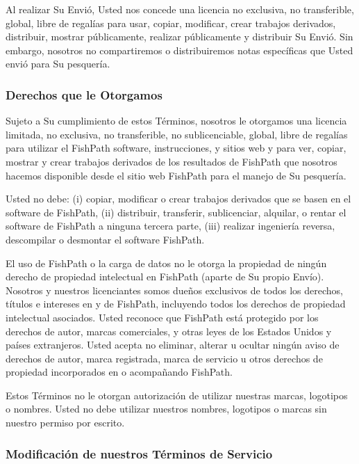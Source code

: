\documentclass[
  11pt,
]{book}
\begin{document}
Al realizar Su Envió, Usted nos concede una licencia no exclusiva, no transferible, global, libre de regalías para usar, copiar, modificar, crear trabajos derivados, distribuir, mostrar públicamente, realizar públicamente y distribuir Su Envió. Sin embargo, nosotros no compartiremos o distribuiremos notas específicas que Usted envió para Su pesquería.

\hypertarget{derechos-que-le-otorgamos}{%
\subsubsection*{Derechos que le Otorgamos}\label{derechos-que-le-otorgamos}}

Sujeto a Su cumplimiento de estos Términos, nosotros le otorgamos una licencia limitada, no exclusiva, no transferible, no sublicenciable, global, libre de regalías para utilizar el FishPath software, instrucciones, y sitios web y para ver, copiar, mostrar y crear trabajos derivados de los resultados de FishPath que nosotros hacemos disponible desde el sitio web FishPath para el manejo de Su pesquería.

Usted no debe: (i) copiar, modificar o crear trabajos derivados que se basen en el software de FishPath, (ii) distribuir, transferir, sublicenciar, alquilar, o rentar el software de FishPath a ninguna tercera parte, (iii) realizar ingeniería reversa, descompilar o desmontar el software FishPath.

El uso de FishPath o la carga de datos no le otorga la propiedad de ningún derecho de propiedad intelectual en FishPath (aparte de Su propio Envío). Nosotros y nuestros licenciantes somos dueños exclusivos de todos los derechos, títulos e intereses en y de FishPath, incluyendo todos los derechos de propiedad intelectual asociados. Usted reconoce que FishPath está protegido por los derechos de autor, marcas comerciales, y otras leyes de los Estados Unidos y países extranjeros. Usted acepta no eliminar, alterar u ocultar ningún aviso de derechos de autor, marca registrada, marca de servicio u otros derechos de propiedad incorporados en o acompañando FishPath.

Estos Términos no le otorgan autorización de utilizar nuestras marcas, logotipos o nombres. Usted no debe utilizar nuestros nombres, logotipos o marcas sin nuestro permiso por escrito.

\hypertarget{modificaciuxf3n-de-nuestros-tuxe9rminos-de-servicio}{%
\subsubsection*{Modificación de nuestros Términos de Servicio}\label{modificaciuxf3n-de-nuestros-tuxe9rminos-de-servicio}}
\end{document}
